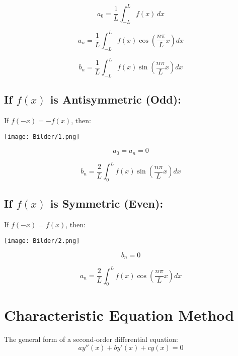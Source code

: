 \documentclass[a4paper,12pt]{article}
\begin{document}
\begin{equation*}
    a_0 = \frac{1}{L} \int_{-L}^{L} f(x)\,dx
\end{equation*}

\begin{equation*}
    a_n = \frac{1}{L} \int_{-L}^{L} f(x) \cos\left(\frac{n \pi}{L} x\right) dx
\end{equation*}

\begin{equation*}
    b_n = \frac{1}{L} \int_{-L}^{L} f(x) \sin\left(\frac{n \pi}{L} x\right) dx
\end{equation*}

\subsection*{If $f(x)$ is Antisymmetric (Odd):}
If $f(-x) = -f(x)$, then:
\begin{center}
\texttt{[image: Bilder/1.png]}
\end{center}
\begin{equation*}
    a_0 = a_n = 0 
\end{equation*}

\begin{equation*}
    b_n = \frac{2}{L} \int_{0}^{L} f(x) \sin\left(\frac{n \pi}{L} x\right) dx
\end{equation*}

\subsection*{If $f(x)$ is Symmetric (Even):}
If $f(-x) = f(x)$, then:
\begin{center}
\texttt{[image: Bilder/2.png]}
\end{center}
\begin{equation*}
    b_n = 0
\end{equation*}

\begin{equation*}
    a_n = \frac{2}{L} \int_{0}^{L} f(x) \cos\left(\frac{n \pi}{L} x\right) dx
\end{equation*}


\section*{Characteristic Equation Method}
The general form of a second-order differential equation:
\begin{equation*}
    a y''(x) + b y'(x) + c y(x) = 0
\end{equation*}
\end{document}

